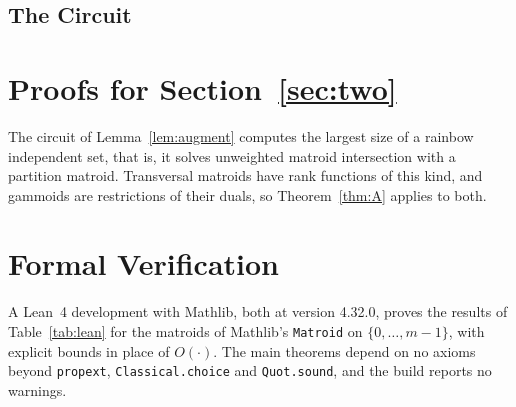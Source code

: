 

\subsection{The Circuit}
\label{app:circuit}





\section{Proofs for Section~\texorpdfstring{\ref{sec:two}}{5}}
\label{app:two}



The circuit of Lemma~\ref{lem:augment} computes the largest size of a rainbow
independent set, that is, it solves unweighted matroid intersection with a
partition matroid.  Transversal matroids have rank functions of this kind, and
gammoids are restrictions of their duals, so Theorem~\ref{thm:A} applies to
both.



\section{Formal Verification}
\label{app:checks}

A Lean~4 development with Mathlib, both at version 4.32.0, proves the results of
Table~\ref{tab:lean} for the matroids of Mathlib's \texttt{Matroid} on
$\{0,\ldots,m-1\}$, with explicit bounds in place of $O(\cdot)$.  The main theorems
depend on no axioms beyond \texttt{propext}, \texttt{Classical.choice} and
\texttt{Quot.sound}, and the build reports no warnings.

